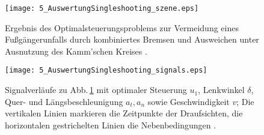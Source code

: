 
\begin{figure}
	\centering
	
	\renewcommand{\matlabtextA}{\scriptsize}
	\texttt{[image: 5\_AuswertungSingleshooting\_szene.eps]}		
    \caption[Unfallvermeidung durch Bremsen und Ausweichen]{Ergebnis des Optimalsteuerungsproblems zur Vermeidung eines Fußgängerunfalls durch kombiniertes Bremsen und Ausweichen unter Ausnutzung des Kamm'schen Kreises .}
    \label{fig:fussgaenger_draufsicht}
\end{figure}
	
\begin{figure}	
\centering
	\def\xlabel{$t$ in $\unit{s}$}
	\def\ylabelA{$v$ in $\unitfrac{m}{s}$}	
	\def\ylabelB{$\delta$ in $\unit{rad}$}	
	\def\ylabelC{$u_1$ in $\unitfrac{rad}{s}$}
	\def\ylabelD{$a_t$ in $\unitfrac{m}{s^2}$}	
	\def\ylabelE{$a_n$ in $\unitfrac{m}{s^2}$}
	
	\renewcommand{\matlabtextA}{\normalsize }
  \texttt{[image: 5\_AuswertungSingleshooting\_signals.eps]}
    \caption[Signalverläufe bei kombiniertem Bremsen und Ausweichen]{Signalverläufe zu Abb.\,\ref{fig:fussgaenger_draufsicht} mit optimaler Steuerung $u_1$, Lenkwinkel $\delta$,  Quer- und Längsbeschleunigung $a_t, a_n$ sowie Geschwindigkeit $v$; Die vertikalen Linien markieren die Zeitpunkte der Draufsichten, die horizontalen gestrichelten Linien die Nebenbedingungen .}
    \label{fig:fussgaenger_draufsicht_signale}
	\end{figure}
	
	

